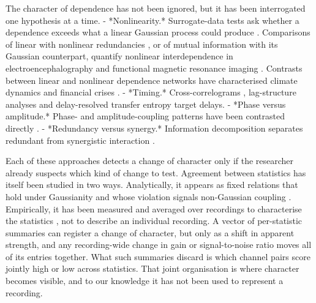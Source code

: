 \documentclass[pdflatex,sn-nature,iicol]{sn-jnl}
\begin{document}
The character of dependence has not been ignored, but it has been interrogated one hypothesis at a time.
- *Nonlinearity.* Surrogate-data tests ask whether a dependence exceeds what a linear Gaussian process could produce \cite{theiler1992testing,prichard1994generating,schreiber2000surrogate}. Comparisons of linear with nonlinear redundancies \cite{palus1995testing}, or of mutual information with its Gaussian counterpart, quantify nonlinear interdependence in electroencephalography \cite{breakspear2002detection} and functional magnetic resonance imaging \cite{hlinka2011functional}. Contrasts between linear and nonlinear dependence networks have characterised climate dynamics and financial crises \cite{donges2009complex,haluszczynski2017linear}.
- *Timing.* Cross-correlograms \cite{perkel1967neuronal}, lag-structure analyses \cite{mitra2014lag} and delay-resolved transfer entropy \cite{wibral2013measuring} target delays.
- *Phase versus amplitude.* Phase- and amplitude-coupling patterns have been contrasted directly \cite{engel2013intrinsic,siems2020dissociated,mostame2020phase}.
- *Redundancy versus synergy.* Information decomposition separates redundant from synergistic interaction \cite{luppi2022synergistic}.

Each of these approaches detects a change of character only if the researcher already suspects which kind of change to test. Agreement between statistics has itself been studied in two ways. Analytically, it appears as fixed relations that hold under Gaussianity and whose violation signals non-Gaussian coupling \cite{nolte2020mathematical}. Empirically, it has been measured and averaged over recordings to characterise the statistics \cite{cliff2023unifying,liu2025benchmarking}, not to describe an individual recording. A vector of per-statistic summaries can register a change of character, but only as a shift in apparent strength, and any recording-wide change in gain or signal-to-noise ratio moves all of its entries together. What such summaries discard is which channel pairs score jointly high or low across statistics. That joint organisation is where character becomes visible, and to our knowledge it has not been used to represent a recording.
\end{document}
